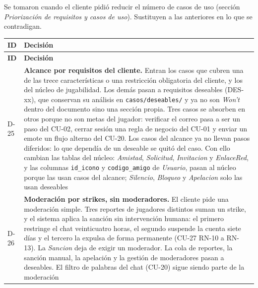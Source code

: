 \begin{center}
\begin{longtable}{|L{0.082\textwidth}|L{0.818\textwidth}|}
\end{longtable}
\end{center}

Se tomaron cuando el cliente pidió reducir el número de casos de uso (sección \textit{Priorización de requisitos y casos de uso}). Sustituyen a las anteriores en lo que se contradigan.

\begin{center}\small
\begin{longtable}{|L{0.082\textwidth}|L{0.818\textwidth}|}
\hline
\textbf{ID} & \textbf{Decisión} \\ \hline
\endfirsthead
\hline
\textbf{ID} & \textbf{Decisión} \\ \hline
\endhead
\mbox{D-25} & \textbf{Alcance por requisitos del cliente.} Entran los casos que cubren una de las trece características o una restricción obligatoria del cliente, y los del núcleo de jugabilidad. Los demás pasan a requisitos deseables (\mbox{DES-xx}), que conservan su análisis en \texttt{casos/deseables/} y ya no son \textit{Won't} dentro del documento sino una sección propia. Tres casos se absorben en otros porque no son metas del jugador: verificar el correo pasa a ser un paso del \mbox{CU-02}, cerrar sesión una regla de negocio del \mbox{CU-01} y enviar un emote un flujo alterno del \mbox{CU-20}. Los casos del alcance ya no llevan pasos diferidos: lo que dependía de un deseable se quitó del caso. Con ello cambian las tablas del núcleo: \textit{Amistad}, \textit{Solicitud}, \textit{Invitacion} y \textit{EnlaceRed}, y las columnas \texttt{id\_\allowbreak{}icono} y \texttt{codigo\_\allowbreak{}amigo} de \textit{Usuario}, pasan al núcleo porque las usan casos del alcance; \textit{Silencio}, \textit{Bloqueo} y \textit{Apelacion} solo las usan deseables \\ \hline
\mbox{D-26} & \textbf{Moderación por strikes, sin moderadores.} El cliente pide una moderación simple. Tres reportes de jugadores distintos suman un strike, y el sistema aplica la sanción sin intervención humana: el primero restringe el chat veinticuatro horas, el segundo suspende la cuenta siete días y el tercero la expulsa de forma permanente (\mbox{CU-27} \mbox{RN-10} a \mbox{RN-13}). La \textit{Sancion} deja de exigir un moderador. La cola de reportes, la sanción manual, la apelación y la gestión de moderadores pasan a deseables. El filtro de palabras del chat (\mbox{CU-20}) sigue siendo parte de la moderación \\ \hline

\end{longtable}
\end{center}
